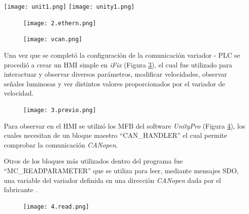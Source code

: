 \begin{center}
	\texttt{[image: unit1.png]}
	\label{fig:uni1}
	\texttt{[image: unity1.png]}
	\label{fig:uni0}
\end{center}



\begin{figure}[h]
	\centering
	\texttt{[image: 2.ethern.png]}
	\label{fig:inter}
\end{figure}

\begin{figure}[h]
	\centering
	\texttt{[image: vcan.png]}
	\label{fig:vcan}
\end{figure}


Una vez que se completó la configuración de la comunicación variador - PLC se procedió a crear un HMI simple en\textit{ iFix} (Figura \ref{fig:previo}), el cual fue utilizado para interactuar y observar diversos parámetros, modificar velocidades, observar señales luminosas y ver distintos valores proporcionados por el variador de velocidad.
 
\begin{figure}[H]
	\centering
	\texttt{[image: 3.previo.png]}
	\label{fig:previo}
\end{figure}

Para observar en el HMI se utilizó los MFB del software \textit{UnityPro} (Figura \ref{fig:read}), los cuales necesitan de un bloque maestro ``CAN\_HANDLER'' el cual permite comprobar la comunicación \textit{CANopen}.

Otros de los bloques más utilizados dentro del programa fue ``MC\_READPARAMETER'' que se utiliza para leer, mediante mensajes SDO, una variable del variador definida en una dirección \textit{CANopen} dada por el fabricante \cite{ComManual}.

\begin{figure}[H]
	\centering
	\texttt{[image: 4.read.png]}
	\label{fig:read}
\end{figure}



